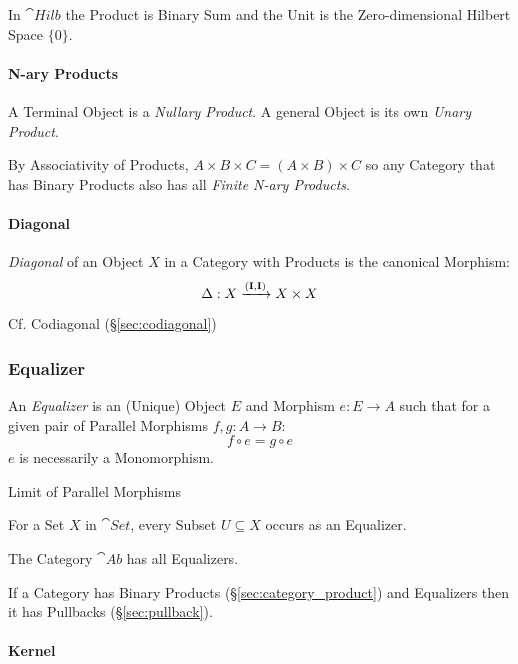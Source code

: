 In $\cat{Hilb}$ the Product is Binary Sum and the Unit is the
Zero-dimensional Hilbert Space $\{ 0 \}$. %



\paragraph{N-ary Products}\label{sec:category_nary}\hfill
A Terminal Object is a \emph{Nullary Product}. A general Object is its
own \emph{Unary Product}.

By Associativity of Products, $A \times B \times C = (A \times B)
\times C$ so any Category that has Binary Products also has all
\emph{Finite N-ary Products}.



\paragraph{Diagonal}\label{sec:diagonal}\hfill

\emph{Diagonal} of an Object $X$ in a Category with Products is the
canonical Morphism:
\[
  \Delta : X \xrightarrow{(\mathbf{I},\mathbf{I})} X \times X
\]

\fist Cf. Codiagonal (\S\ref{sec:codiagonal})



\subsubsection{Equalizer}\label{sec:equalizer}

An \emph{Equalizer} is an (Unique) Object $E$ and Morphism $e: E
\rightarrow A$ such that for a given pair of Parallel Morphisms $f,g :
A \rightarrow B$:
\[
  f \circ e = g \circ e
\]
$e$ is necessarily a Monomorphism.

Limit of Parallel Morphisms

For a Set $X$ in $\cat{Set}$, every Subset $U \subseteq X$ occurs
as an Equalizer.

The Category $\cat{Ab}$ has all Equalizers.

If a Category has Binary Products (\S\ref{sec:category_product}) and
Equalizers then it has Pullbacks (\S\ref{sec:pullback}).



\paragraph{Kernel}\label{sec:morphism_kernel}\hfill


